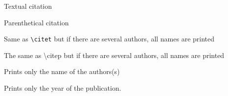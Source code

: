 \citet{art2018} Textual citation

\citep{art2018} Parenthetical citation

\citet*{art2018} Same as \texttt{\textbackslash{}citet} but if there are several authors, all names are printed

\citep*{art2018} The same as {\textbackslash{}}citep but if there are several authors, all names are printed

\citeauthor{art2018} Prints only the name of the authors(s)

\citeyear{art2018} Prints only the year of the publication.